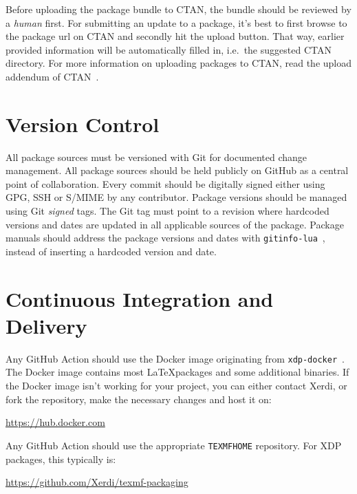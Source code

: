 \documentclass{xdpdoc}
\begin{document}
\begin{multicols}{2}
        Before uploading the package bundle to CTAN, the bundle should be reviewed by a \textit{human} first.
        For submitting an update to a package,
        it's best to first browse to the package url on CTAN and secondly hit the upload button.
        That way, earlier provided information will be automatically filled in, i.e.\ the suggested CTAN directory.
        For more information on uploading packages to CTAN, read the upload addendum of CTAN~\cite{ctan:help:addendum}.


        \section{Version Control}\label{sec:git}

        All package sources must be versioned with Git for documented change management.
        All package sources should be held publicly on GitHub as a central point of collaboration.
        Every commit should be digitally signed either using GPG, SSH or S/MIME by any contributor.
        Package versions should be managed using Git \textit{signed} tags.
        The Git tag must point to a revision
        where hardcoded versions and dates are updated in all applicable sources of the package.
        Package manuals should address the package versions and dates with \texttt{gitinfo-lua}~\cite{gitinfo-lua},
        instead of inserting a hardcoded version and date.


        \section{Continuous Integration and Delivery}\label{sec:cicd}

        Any GitHub Action should use the Docker image originating from \texttt{xdp-docker}~\cite{xdp-docker}.
        The Docker image contains most \LaTeX packages and some additional binaries.
        If the Docker image isn't working for your project, you can either contact Xerdi, or fork the repository, make the necessary changes and host it on:
        \begin{center}
            \url{https://hub.docker.com}
        \end{center}

        Any GitHub Action should use the appropriate \texttt{TEXMFHOME} repository.
        For XDP packages, this typically is:
        \begin{center}
        \url{https://github.com/Xerdi/texmf-packaging}
        \end{center}


\end{multicols}
\end{document}
